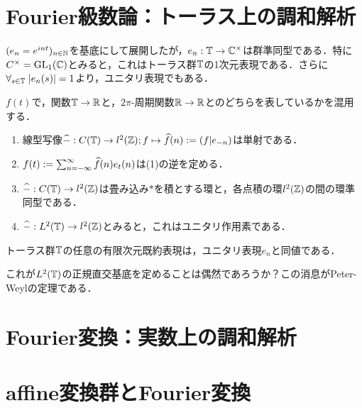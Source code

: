 \documentclass[uplatex,dvipdfmx]{jsreport}
\begin{document}
\section{Fourier級数論：トーラス上の調和解析}

\begin{tcolorbox}[colframe=ForestGreen, colback=ForestGreen!10!white,breakable,colbacktitle=ForestGreen!40!white,coltitle=black,fonttitle=\bfseries\sffamily,
title=]
    $(e_n=e^{int})_{n\in\mathbb{N}}$を基底にして展開したが，$e_n:\mathbb{T}\to\mathbb{C}^\times$は群準同型である．特に$C^\times=\mathrm{GL}_1(\mathbb{C})$とみると，これはトーラス群$\mathbb{T}$の1次元表現である．さらに$\forall_{s\in\mathbb{T}}\;\lvert e_n(s)\rvert=1$より，ユニタリ表現でもある．
\end{tcolorbox}

\begin{notation}
    $f(t)$で，関数$\mathbb{T}\to\mathbb{R}$と，$2\pi$-周期関数$\mathbb{R}\to\mathbb{R}$とのどちらを表しているかを混用する．
\end{notation}

\begin{theorem}
    \begin{enumerate}
        \item 線型写像$\widehat{-}:C(\mathbb{T})\to l^2(\mathbb{Z});f\mapsto\widehat{f}(n):=(f|e_{-n})$は単射である．
        \item $f(t):=\sum^\infty_{n=-\infty}\widehat{f}(n)e_t(n)$は(1)の逆を定める．
        \item $\widehat{-}:C(\mathbb{T})\to l^2(\mathbb{Z})$は畳み込み$*$を積とする環と，各点積の環$l^2(\mathbb{Z})$の間の環準同型である．
        \item $\widehat{-}:L^2(\mathbb{T})\to l^2(\mathbb{Z})$とみると，これはユニタリ作用素である．
    \end{enumerate}
\end{theorem}

\begin{theorem}
    トーラス群$\mathbb{T}$の任意の有限次元既約表現は，ユニタリ表現$e_n$と同値である．
\end{theorem}
\begin{remarks}
    これが$L^2(\mathbb{T})$の正規直交基底を定めることは偶然であろうか？この消息がPeter-Weylの定理である．
\end{remarks}

\section{Fourier変換：実数上の調和解析}

\section{affine変換群とFourier変換}
\end{document}
